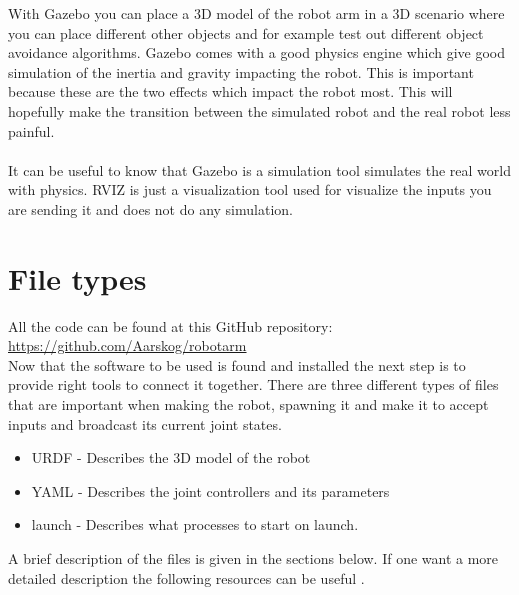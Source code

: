 With Gazebo you can place a 3D model of the robot arm in a 3D scenario where you can place different other objects and for example test out different object avoidance algorithms. Gazebo comes with a good physics engine which give good simulation of the inertia and gravity impacting the robot\cite{Gazebo}. This is important because these are the two effects which impact the robot most. This will hopefully make the transition between the simulated robot and the real robot less painful. \\\\
It can be useful to know that Gazebo is a simulation tool simulates the real world with physics. RVIZ is just a visualization tool used for visualize the inputs you are sending it and does not do any simulation. 









\section{File types}
All the code can be found at this GitHub repository: \href{https://github.com/Aarskog/robotarm}{\underline{https://github.com/Aarskog/robotarm}}\\

Now that the software to be used is found and installed the next step is to provide right tools to connect it together. There are three different types of files that are important when making the robot, spawning it and make it to accept inputs and broadcast its current joint states. 
\begin{itemize}
    \item URDF - Describes the 3D model of the robot
    \item YAML - Describes the joint controllers and its parameters
    \item launch - Describes what processes to start on launch.
\end{itemize}
A brief description of the files is given in the sections below.  If one want a more detailed description the following resources can be useful \cite{ROSWiki,GazeboURDF,XMLdoc,YAMLdoc}.

